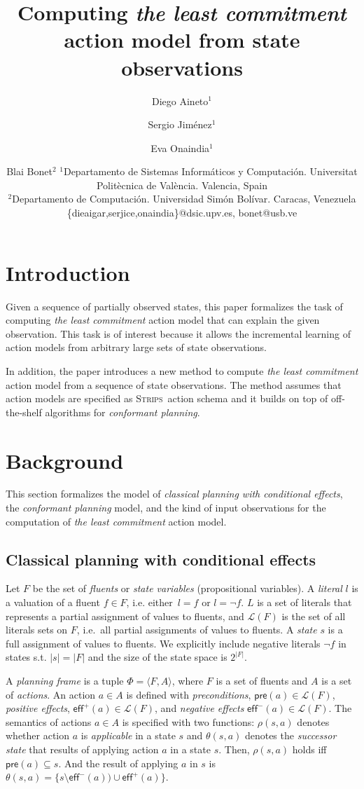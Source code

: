 \documentclass{article}
\title{Computing {\em the least commitment} action model from state observations}
\author{
Diego Aineto$^1$\and
Sergio Jim\'enez$^1$\and
Eva Onaindia$^1$\And
\and
Blai Bonet$^2$
\affiliations
$^1${\small Departamento de Sistemas Inform\'aticos y Computaci\'on. Universitat Polit\`ecnica de Val\`encia. Valencia, Spain}\\
$^2${\small Departamento de Computaci\'on. Universidad Sim\'on Bolívar. Caracas, Venezuela}
\emails
{\scriptsize \{dieaigar,serjice,onaindia\}@dsic.upv.es, bonet@usb.ve}}
\newcommand{\tup}[1]{{\langle #1 \rangle}}
\newcommand{\pre}{\mathsf{pre}}     %
\newcommand{\eff}{\mathsf{eff}}     %
\newcommand{\strips}{\textsc{Strips}}
\begin{document}
\maketitle

\begin{abstract}
  
\end{abstract}

\section{Introduction}
Given a sequence of partially observed states, this paper formalizes the task of computing {\em the least commitment} action model that can explain the given observation. This task is of interest because it allows the incremental learning of action models from arbitrary large sets of state observations.

In addition, the paper introduces a new method to compute {\em the least commitment} action model from a sequence of state observations. The method assumes that action models are specified as \strips\ action schema and it builds on top of off-the-shelf algorithms for {\em conformant planning}.



\section{Background}
This section formalizes the model of {\em classical planning with conditional effects}, the {\em conformant planning} model, and the kind of input observations for the computation of {\em the least commitment} action model.  

\subsection{Classical planning with conditional effects}
Let $F$ be the set of {\em fluents} or {\em state variables} (propositional variables). A {\em literal} $l$ is a valuation of a fluent $f\in F$, i.e. either~$l=f$ or $l=\neg f$. $L$ is a set of literals that represents a partial assignment of values to fluents, and $\mathcal{L}(F)$ is the set of all literals sets on $F$, i.e.~all partial assignments of values to fluents. A {\em state} $s$ is a full assignment of values to fluents. We explicitly include negative literals $\neg f$ in states s.t. $|s|=|F|$ and the size of the state space is $2^{|F|}$.

A {\em planning frame} is a tuple $\Phi=\tup{F,A}$, where $F$ is a set of fluents and $A$ is a set of \emph{actions}. An action $a\in A$ is defined with {\em preconditions}, $\pre(a)\in\mathcal{L}(F)$, {\em positive effects}, $\eff^+(a)\in\mathcal{L}(F)$, and {\em negative effects} $\eff^-(a)\in\mathcal{L}(F)$. The semantics of actions $a\in A$ is specified with two functions: $\rho(s,a)$ denotes whether action $a$ is {\em applicable} in a state $s$ and $\theta(s,a)$ denotes the {\em successor state} that results of applying action $a$ in a state $s$. Then, $\rho(s,a)$ holds iff $\pre(a)\subseteq s$. And the result of applying $a$ in $s$ is $\theta(s,a)=\{s\setminus\eff^-(a))\cup\eff^+(a)\}$.
\end{document}
